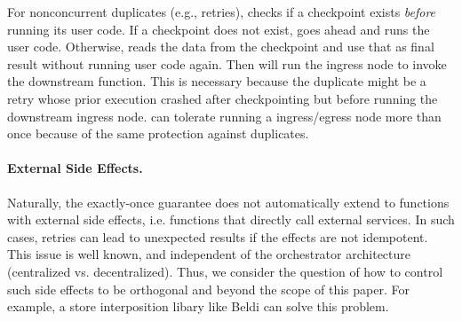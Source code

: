 For nonconcurrent duplicates (e.g., retries), \name{} checks if a checkpoint
exists \emph{before} running its user code. If a checkpoint does not exist,
\name{} goes ahead and runs the user code. Otherwise, \name{} reads the data
from the checkpoint and use that as final result without running user code
again. Then \name{} will run the ingress node to invoke the downstream function.
This is necessary because the duplicate might be a retry whose prior execution
crashed after checkpointing but before running the downstream ingress node. \name{} can
tolerate running a ingress/egress node more than once because of the same protection
against duplicates.

\paragraph{External Side Effects.} Naturally, the
exactly-once guarantee does not automatically extend to functions with external side effects, 
i.e. functions that directly call external services. In such cases, retries can lead 
to unexpected results if the effects are not idempotent. This issue is well known, and independent of 
the orchestrator architecture (centralized vs. decentralized). 
Thus, we consider the question of how to control such side effects to be
orthogonal and beyond the scope of this paper.
For example, a store interposition libary like Beldi \cite{beldi} can solve this problem. 